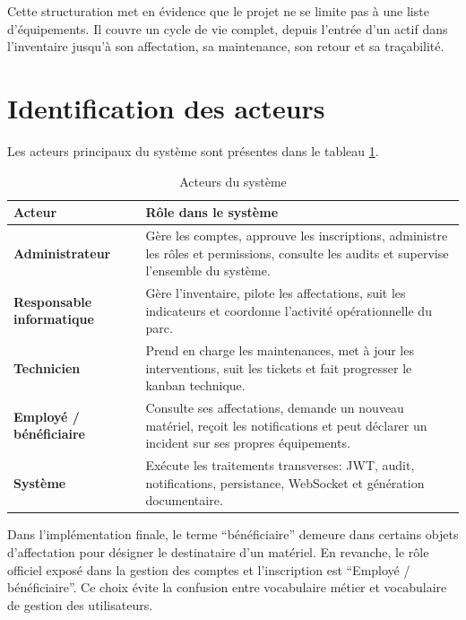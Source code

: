 Cette structuration met en évidence que le projet ne se limite pas à une liste d'équipements. Il couvre un cycle de vie complet, depuis l'entrée d'un actif dans l'inventaire jusqu'à son affectation, sa maintenance, son retour et sa traçabilité.

\section{Identification des acteurs}
Les acteurs principaux du système sont présentes dans le tableau \ref{tab:acteurs}.

\begin{table}[H]
\centering
\caption{Acteurs du système}
\label{tab:acteurs}
\begin{tabularx}{\textwidth}{>{\bfseries}p{3.3cm}X}
\toprule
Acteur & Rôle dans le système \\
\midrule
Administrateur & Gère les comptes, approuve les inscriptions, administre les rôles et permissions, consulte les audits et supervise l'ensemble du système. \\
Responsable informatique & Gère l'inventaire, pilote les affectations, suit les indicateurs et coordonne l'activité opérationnelle du parc. \\
Technicien & Prend en charge les maintenances, met à jour les interventions, suit les tickets et fait progresser le kanban technique. \\
Employé / bénéficiaire & Consulte ses affectations, demande un nouveau matériel, reçoit les notifications et peut déclarer un incident sur ses propres équipements. \\
Système & Exécute les traitements transverses: JWT, audit, notifications, persistance, WebSocket et génération documentaire. \\
\bottomrule
\end{tabularx}
\end{table}

Dans l'implémentation finale, le terme \enquote{bénéficiaire} demeure dans certains objets d'affectation pour désigner le destinataire d'un matériel. En revanche, le rôle officiel exposé dans la gestion des comptes et l'inscription est \enquote{Employé / bénéficiaire}. Ce choix évite la confusion entre vocabulaire métier et vocabulaire de gestion des utilisateurs.

